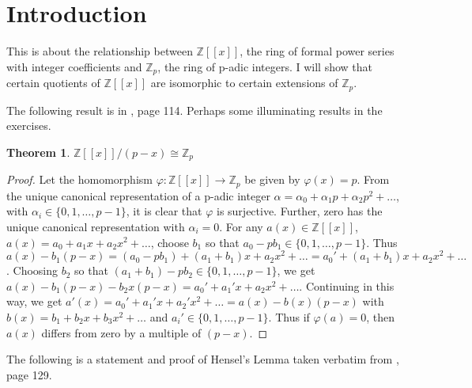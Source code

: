 \documentclass{article}
\newtheorem{theorem}{Theorem}
\begin{document}
\section{Introduction}

This is about the relationship between $\mathbb{Z}[[x]]$, the ring of formal power series with integer coefficients and $\mathbb{Z}_p$, the ring of p-adic integers.  I will show that certain quotients of $\mathbb{Z}[[x]]$ are isomorphic to certain extensions of $\mathbb{Z}_p$.

The following result is in \cite{MR1697859}, page 114.  Perhaps some illuminating results in the exercises.

\begin{theorem}\label{Z_p}
$\mathbb{Z}[[x]]/(p-x) \cong \mathbb{Z}_p$
\end{theorem}
\begin{proof}
Let the homomorphism $\varphi : \mathbb{Z}[[x]] \rightarrow \mathbb{Z}_p$ be given by $\varphi(x) = p$.  From the unique canonical representation of a p-adic integer $\alpha = \alpha_0 + \alpha_1 p  + \alpha_2 p^2 + \ldots$, with $\alpha_i \in \{0, 1, \ldots, p-1\}$, it is clear that $\varphi$ is surjective.  Further, zero has the unique canonical  representation with $\alpha_i = 0$.  For any $a(x) \in \mathbb{Z}[[x]]$, $a(x) = a_0 + a_1 x + a_2 x^2 + \ldots$, choose $b_1$ so that $a_0 - pb_1 \in \{0, 1, \ldots, p-1\}$.  Thus $a(x) - b_1(p-x) = (a_0 - pb_1) + (a_1 + b_1)x + a_2 x^2 + \ldots = a_0' + (a_1 + b_1)x + a_2 x^2 + \ldots$.  Choosing $b_2$ so that $(a_1 + b_1) - pb_2 \in \{0, 1, \ldots, p-1\}$, we get $a(x) - b_1(p-x) - b_2x(p-x) = a_0' + a_1'x + a_2 x^2 + \ldots$.  Continuing in this way, we get $a'(x)= a_0' + a_1'x + a_2' x^2 + \ldots = a(x) - b(x)(p-x)$ with $b(x) = b_1 + b_2x + b_3x^2 + \ldots$ and $a_i' \in \{0,1,\ldots,p-1\}$.  Thus if $\varphi(a) = 0$, then $a(x)$ differs from zero by a multiple of $(p-x)$.
\end{proof}

The following is a statement and proof of Hensel's Lemma taken verbatim from \cite{MR1697859}, page 129.
\end{document}
